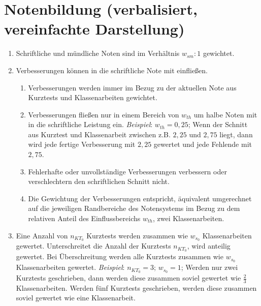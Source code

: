 \section{Notenbildung (verbalisiert, vereinfachte Darstellung)}
{\normalsize
\begin{enumerate}[label=\textbf{\arabic*)}]
	\item Schriftliche und mündliche Noten sind im Verhältnis $w_{sm} : 1$ gewichtet.
	\item Verbesserungen können in die schriftliche Note mit einfließen.
	\begin{enumerate}[label=\textbf{(\alph*)}]
		\item Verbesserungen werden immer im Bezug zu der aktuellen Note aus Kurztests und Klassenarbeiten gewichtet.
		\item Verbesserungen fließen nur in einem Bereich von $w_{th}$ um halbe Noten mit in die schriftliche Leistung ein. \textit{Beispiel}: $w_{th}=0{,}25$; Wenn der Schnitt aus Kurztest und Klassenarbeit zwischen z.B. $2{,}25$ und $2{,}75$ liegt, dann wird jede fertige Verbesserung mit $2{,}25$ gewertet und jede Fehlende mit $2{,}75$.
		\item Fehlerhafte oder unvollständige Verbesserungen verbessern oder verschlechtern den schriftlichen Schnitt nicht.
		\item Die Gewichtung der Verbesserungen entspricht, äquivalent umgerechnet auf die jeweiligen Randbereiche des Notensystems im Bezug zu dem relativen Anteil des Einflussbereichs $w_{th}$, zwei Klassenarbeiten.
	\end{enumerate}
	\item Eine Anzahl von $n_{KT_0}$ Kurztests werden zusammen wie $w_{s_0}$ Klassenarbeiten gewertet. Unterschreitet die Anzahl der Kurztests $n_{KT_0}$, wird anteilig gewertet. Bei Überschreitung werden alle Kurztests zusammen wie  $w_{s_0}$ Klassenarbeiten gewertet. \textit{Beispiel}:  $n_{KT_0} = 3$; $w_{s_0}=1$; Werden nur zwei Kurztests geschrieben, dann werden diese zusammen soviel gewertet wie $\frac{2}{3}$ Klassenarbeiten. Werden fünf Kurztests geschrieben, werden diese zusammen soviel gewertet wie eine Klassenarbeit.
\end{enumerate}
}

